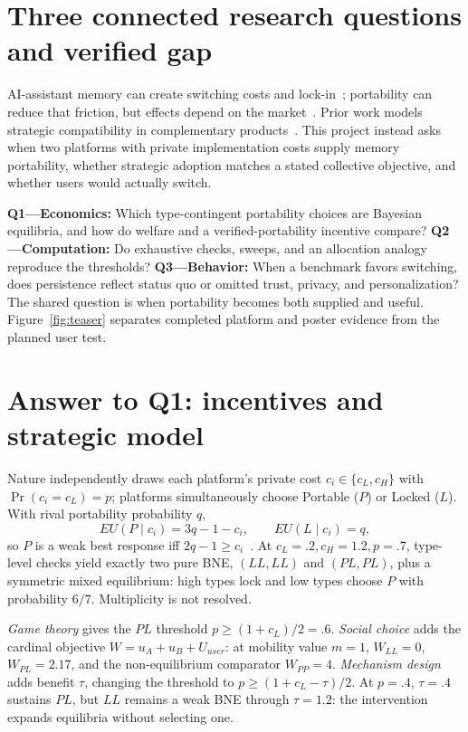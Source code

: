\section{Three connected research questions and verified gap}
AI-assistant memory can create switching costs and lock-in~\cite{farrell2007coordination}; portability can reduce that friction, but effects depend on the market~\cite{viard2007switching,kim2026portability}. Prior work models strategic compatibility in complementary products~\cite{jeon2023compatibility}. This project instead asks when two platforms with private implementation costs supply memory portability, whether strategic adoption matches a stated collective objective, and whether users would actually switch.

\textbf{Q1---Economics:} Which type-contingent portability choices are Bayesian equilibria, and how do welfare and a verified-portability incentive compare? \textbf{Q2---Computation:} Do exhaustive checks, sweeps, and an allocation analogy reproduce the thresholds? \textbf{Q3---Behavior:} When a benchmark favors switching, does persistence reflect status quo or omitted trust, privacy, and personalization? The shared question is when portability becomes both supplied and useful. Figure~\ref{fig:teaser} separates completed platform and poster evidence from the planned user test.

\section{Answer to Q1: incentives and strategic model}
Nature independently draws each platform's private cost $c_i\in\{c_L,c_H\}$ with $\Pr(c_i=c_L)=p$; platforms simultaneously choose Portable ($P$) or Locked ($L$). With rival portability probability $q$,
\[
EU(P\mid c_i)=3q-1-c_i,\qquad EU(L\mid c_i)=q,
\]
so $P$ is a weak best response iff $2q-1\ge c_i$~\cite{harsanyi1968}. At $c_L=.2,c_H=1.2,p=.7$, type-level checks yield exactly two pure BNE, $(LL,LL)$ and $(PL,PL)$, plus a symmetric mixed equilibrium: high types lock and low types choose $P$ with probability $6/7$. Multiplicity is not resolved.

\emph{Game theory} gives the $PL$ threshold $p\ge(1+c_L)/2=.6$. \emph{Social choice} adds the cardinal objective $W=u_A+u_B+U_{user}$: at mobility value $m=1$, $W_{LL}=0$, $W_{PL}=2.17$, and the non-equilibrium comparator $W_{PP}=4$. \emph{Mechanism design} adds benefit $\tau$, changing the threshold to $p\ge(1+c_L-\tau)/2$. At $p=.4$, $\tau=.4$ sustains $PL$, but $LL$ remains a weak BNE through $\tau=1.2$: the intervention expands equilibria without selecting one.

